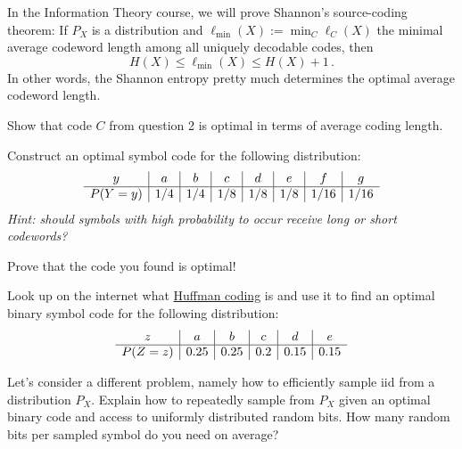 \documentclass[10pt, a5paper]{scrartcl}
\newcommand{\len}{\ell}
\begin{document}
\begin{exercise}
	In the Information Theory course, we will prove Shannon's source-coding theorem: 
	If $P_X$ is a distribution and $\ell_{\min}(X) := \min_C \len_C(X)$
		the minimal average codeword length among all uniquely decodable codes, then
		\[
			H(X) \leq \ell_{\min}(X) \leq H(X)+1 \, .
		\]
	In other words, the Shannon entropy pretty much determines the optimal average codeword length.

	\begin{subex}
		Show that code $C$ from question 2 is optimal in terms of average coding length.
	\end{subex}
	
	\begin{subex}
		Construct an optimal symbol code for the following distribution:
		\[
			\begin{array}{c | c | c | c | c | c | c | c}
			y & a & b & c & d & e & f & g\\
			\hline
			P(Y=y) & 1/4 & 1/4   & 1/8   & 1/8 & 1/8 & 1/16 & 1/16 \\
			\end{array}
		\]
		\emph{Hint: should symbols with high probability to occur receive long or short codewords?}
	\end{subex}
	
	\begin{subex}
		Prove that the code you found is optimal!		
	\end{subex}
	
 	\begin{subex} 
		Look up on the internet what
		\href{https://en.wikipedia.org/wiki/Huffman_coding}{Huffman coding} 
		is and use it to find an optimal binary symbol code for the following distribution:
		\[
			\begin{array}{c | c | c | c | c | c}
			z & a & b & c & d & e\\
			\hline
			P(Z=z) & 0.25 & 0.25   & 0.2   & 0.15 & 0.15 \\
			\end{array}
		\]
 	\end{subex}
\end{exercise}


\begin{exercise}
	Let's consider a different problem, namely how to efficiently sample iid from a distribution $P_X$. 
	Explain how to repeatedly sample from $P_X$ given an optimal binary code and access to uniformly distributed random bits. 
	How many random bits per sampled symbol do you need on average?
\end{exercise}
\end{document}
